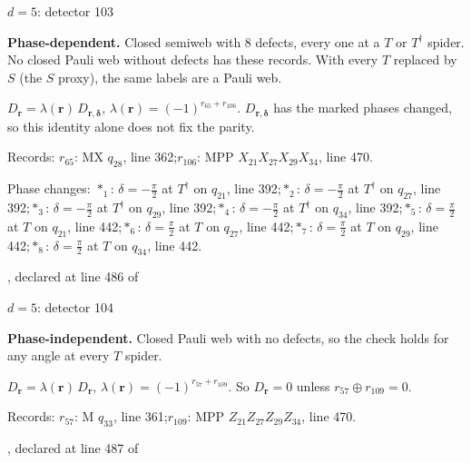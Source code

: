 \label{d5_det103}
{\Large $d=5$: detector 103}\par
\textbf{Phase-dependent.} Closed semiweb with 8 defects, every one at a $T$ or $T^\dagger$ spider. No closed Pauli web without defects has these records. With every $T$ replaced by $S$ (the $S$ proxy), the same labels are a Pauli web.
\begin{center}
\end{center}
\vspace{-1mm}
$D_{\boldsymbol r}=\lambda(\boldsymbol r)\,D_{\boldsymbol r,\boldsymbol\delta}$, \quad $\lambda(\boldsymbol r)=(-1)^{r_{65}+r_{106}}$. \qquad $D_{\boldsymbol r,\boldsymbol\delta}$ has the marked phases changed, so this identity alone does not fix the parity.
\par\smallskip\begin{minipage}{.98\linewidth}\small Records: $r_{65}$: MX $q_{28}$, line 362;\quad $r_{106}$: MPP $X_{21}X_{27}X_{29}X_{34}$, line 470.\end{minipage}
\par\smallskip\begin{minipage}{.98\linewidth}\small Phase changes: $\ast_{1}$: $\delta=-\frac{\pi}{2}$ at $T^\dagger$ on $q_{21}$, line 392;\quad $\ast_{2}$: $\delta=-\frac{\pi}{2}$ at $T^\dagger$ on $q_{27}$, line 392;\quad $\ast_{3}$: $\delta=-\frac{\pi}{2}$ at $T^\dagger$ on $q_{29}$, line 392;\quad $\ast_{4}$: $\delta=-\frac{\pi}{2}$ at $T^\dagger$ on $q_{34}$, line 392;\quad $\ast_{5}$: $\delta=\frac{\pi}{2}$ at $T$ on $q_{21}$, line 442;\quad $\ast_{6}$: $\delta=\frac{\pi}{2}$ at $T$ on $q_{27}$, line 442;\quad $\ast_{7}$: $\delta=\frac{\pi}{2}$ at $T$ on $q_{29}$, line 442;\quad $\ast_{8}$: $\delta=\frac{\pi}{2}$ at $T$ on $q_{34}$, line 442.\end{minipage}
\vfill
{\footnotesize\texttt{}, declared at line 486 of \texttt{}}
\newpage

\label{d5_det104}
{\Large $d=5$: detector 104}\par
\textbf{Phase-independent.} Closed Pauli web with no defects, so the check holds for any angle at every $T$ spider.
\begin{center}
\end{center}
\vspace{-1mm}
$D_{\boldsymbol r}=\lambda(\boldsymbol r)\,D_{\boldsymbol r}$, \quad $\lambda(\boldsymbol r)=(-1)^{r_{57}+r_{109}}$. \qquad So $D_{\boldsymbol r}=0$ unless $r_{57}\oplus r_{109}=0$.
\par\smallskip\begin{minipage}{.98\linewidth}\small Records: $r_{57}$: M $q_{33}$, line 361;\quad $r_{109}$: MPP $Z_{21}Z_{27}Z_{29}Z_{34}$, line 470.\end{minipage}
\vfill
{\footnotesize\texttt{}, declared at line 487 of \texttt{}}
\newpage

